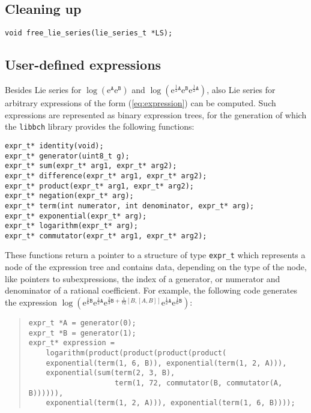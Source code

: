 \documentclass[11pt,a4paper]{article}
\newcommand{\ee}{\mathrm{e}}
\renewcommand{\AA}{\mathtt{A}}
\newcommand{\BB}{\mathtt{B}}
\begin{document}
\subsection{Cleaning up}
\begin{verbatim}
void free_lie_series(lie_series_t *LS);
\end{verbatim}


\subsection{User-defined expressions}\label{SubSec:UserDefExpr}
Besides Lie series for  $\log(\ee^{\AA}\ee^{\BB})$ and
$\log(\ee^{\frac{1}{2}\AA}\ee^{\BB}\ee^{\frac{1}{2}\AA})$, also 
Lie series for arbitrary expressions of the form (\ref{eq:expression})
can be computed.
Such expressions are represented as  binary expression
trees, for the generation of which  the \verb|libbch| library
provides the following functions:
%
\begin{verbatim}
expr_t* identity(void);
expr_t* generator(uint8_t g);
expr_t* sum(expr_t* arg1, expr_t* arg2);
expr_t* difference(expr_t* arg1, expr_t* arg2);
expr_t* product(expr_t* arg1, expr_t* arg2);
expr_t* negation(expr_t* arg);
expr_t* term(int numerator, int denominator, expr_t* arg);
expr_t* exponential(expr_t* arg);
expr_t* logarithm(expr_t* arg);
expr_t* commutator(expr_t* arg1, expr_t* arg2);
\end{verbatim}
These functions return a pointer to a structure of type \verb|expr_t|
which represents a node of the expression tree and contains data,
depending on the type of the node,
like pointers to subexpressions, the index of a generator, or numerator and
denominator of a rational coefficient.
For example, the following code generates the 
expression 
$\log(\ee^{\frac{1}{6}\BB}\ee^{\frac{1}{2}\AA}
\ee^{\frac{2}{3}\BB+\frac{1}{72}[B,[A,B]]}\ee^{\frac{1}{2}\AA}\ee^{\frac{1}{6}\BB})$:
\begin{quote} %
{\small\begin{BVerbatim}
expr_t *A = generator(0);
expr_t *B = generator(1);
expr_t* expression =
    logarithm(product(product(product(product(
    exponential(term(1, 6, B)), exponential(term(1, 2, A))),
    exponential(sum(term(2, 3, B), 
                    term(1, 72, commutator(B, commutator(A, B)))))), 
    exponential(term(1, 2, A))), exponential(term(1, 6, B))));
\end{BVerbatim}
}
\end{quote}
\end{document}
